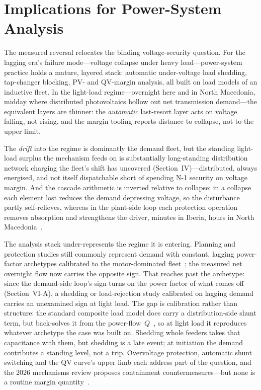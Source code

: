\documentclass[journal]{IEEEtran}
\begin{document}
\section{Implications for Power-System Analysis}
The measured reversal relocates the binding voltage-security question. For the
lagging era's failure mode---voltage collapse under heavy load---power-system
practice holds a mature, layered stack: automatic under-voltage load shedding,
tap-changer blocking, PV- and QV-margin analysis, all built on load models of an
inductive fleet. In the light-load regime---overnight here and in North Macedonia, midday where distributed photovoltaics hollow out net transmission demand---the equivalent layers are thinner: the \emph{automatic} last-resort layer acts on voltage falling, not rising, and the margin tooling reports distance to collapse, not to the upper limit. 

The \emph{drift}
into the regime is dominantly the demand fleet, but the standing light-load surplus the mechanism feeds on is substantially long-standing distribution network charging the fleet's shift has uncovered (Section~IV)---distributed, always energised, and
not itself dispatchable short of spending N-1 security on voltage margin. And the
cascade arithmetic is inverted relative to collapse: in a collapse each element lost reduces the demand depressing voltage, so the disturbance partly self-relieves, whereas in the plant-side loop each protection
operation removes absorption and strengthens the driver, minutes in Iberia, hours in North Macedonia~\cite{hume_extended}.

The analysis stack under-represents the regime it is entering. Planning and
protection studies still commonly represent demand with constant, lagging
power-factor archetypes calibrated to the motor-dominated
fleet~\cite{cigre_tb719,epri_loadmodel}; the measured net overnight flow now
carries the opposite sign. That reaches past the archetype: since the demand-side
loop's sign turns on the power factor of what comes off (Section~VI-A), a shedding
or load-rejection study calibrated on lagging demand carries an unexamined sign at
light load. The gap is calibration rather than structure: the standard composite load model does carry a distribution-side shunt term, but back-solves it from the power-flow~$Q$~\cite{wecc_cmpldw}, so at light load it reproduces whatever archetype the case was built on. Shedding whole feeders takes that capacitance with them, but shedding is a late event; at initiation the demand contributes a standing level, not a trip. Overvoltage protection, automatic shunt switching and the QV curve's upper limb each address part of the question, and the 2026 mechanisms review proposes containment countermeasures---but none is a routine margin quantity~\cite{vournas2026review}.
\end{document}
